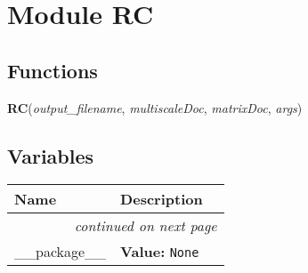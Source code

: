 %
%
%


\section{Module RC}

    \label{RC}


  \subsection{Functions}

    \label{RC:RC}

    \vspace{0.5ex}

\hspace{.8\funcindent}\begin{boxedminipage}{\funcwidth}

    \raggedright \textbf{RC}(\textit{output\_filename}, \textit{multiscaleDoc}, \textit{matrixDoc}, \textit{args})

\setlength{\parskip}{2ex}
\setlength{\parskip}{1ex}
    \end{boxedminipage}



  \subsection{Variables}

    \vspace{-1cm}
\hspace{\varindent}\begin{longtable}{|p{\varnamewidth}|p{\vardescrwidth}|l}
\cline{1-2}
\cline{1-2} \centering \textbf{Name} & \centering \textbf{Description}& \\
\cline{1-2}
\endhead\cline{1-2}\multicolumn{3}{r}{\small\textit{continued on next page}}\\\endfoot\cline{1-2}
\endlastfoot\raggedright \_\-\_\-p\-a\-c\-k\-a\-g\-e\-\_\-\_\- & \raggedright \textbf{Value:} 
{\tt None}&\\
\cline{1-2}
\end{longtable}

